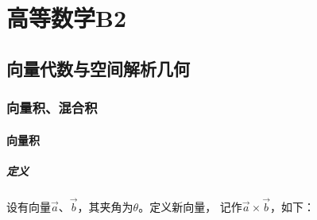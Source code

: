 \documentclass[
	11pt, %
	a4paper, %
]{WhuSakuraBook}
\begin{document}
\tableofcontents %



\pagestyle{fancy} %

\cleardoublepage %


\part{高等数学B2}


\chapterspaceabove{6.75cm} %
\chapterspacebelow{7.25cm} %


\chapter{向量代数与空间解析几何}

\section{向量积、混合积}

\subsection{向量积}

\subsubsection*{定义}

    设有向量\(\overrightarrow{a}\)、\(\overrightarrow{b}\)，其夹角为\(\theta\)。定义新向量，
    记作\(\overrightarrow{a} \times \overrightarrow{b}\)，如下：
\end{document}
